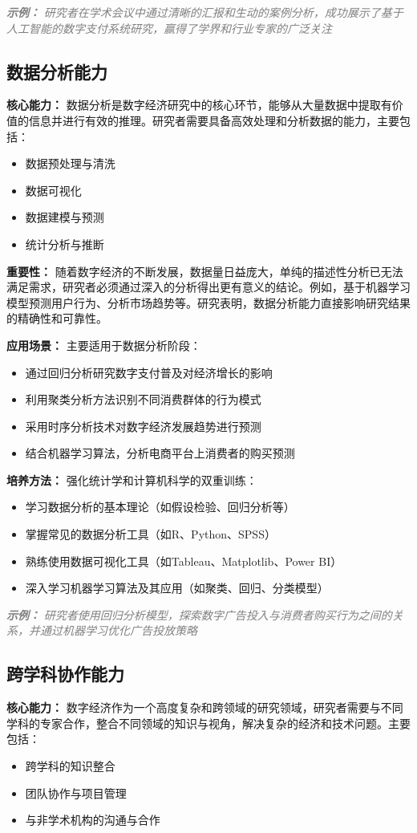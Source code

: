 \documentclass[lang=cn,12pt,a4paper]{elegantpaper}
\newcommand{\skillexample}[1]{\smallskip\noindent\textcolor{gray}{\textit{\footnotesize\textbf{示例：}} \textit{\footnotesize #1}}}
\begin{document}
\skillexample{研究者在学术会议中通过清晰的汇报和生动的案例分析，成功展示了基于人工智能的数字支付系统研究，赢得了学界和行业专家的广泛关注}
\subsection{数据分析能力}
{\textbf{核心能力：}} 数据分析是数字经济研究中的核心环节，能够从大量数据中提取有价值的信息并进行有效的推理。研究者需要具备高效处理和分析数据的能力，主要包括：
\begin{itemize}
    \item 数据预处理与清洗
    \item 数据可视化
    \item 数据建模与预测
    \item 统计分析与推断
\end{itemize}

{\textbf{重要性：}} 随着数字经济的不断发展，数据量日益庞大，单纯的描述性分析已无法满足需求，研究者必须通过深入的分析得出更有意义的结论。例如，基于机器学习模型预测用户行为、分析市场趋势等。研究表明，数据分析能力直接影响研究结果的精确性和可靠性。

{\textbf{应用场景：}} 主要适用于数据分析阶段：
\begin{itemize}
    \item 通过回归分析研究数字支付普及对经济增长的影响
    \item 利用聚类分析方法识别不同消费群体的行为模式
    \item 采用时序分析技术对数字经济发展趋势进行预测
    \item 结合机器学习算法，分析电商平台上消费者的购买预测
\end{itemize}

{\textbf{培养方法：}} 强化统计学和计算机科学的双重训练：
\begin{itemize}
    \item 学习数据分析的基本理论（如假设检验、回归分析等）
    \item 掌握常见的数据分析工具（如R、Python、SPSS）
    \item 熟练使用数据可视化工具（如Tableau、Matplotlib、Power BI）
    \item 深入学习机器学习算法及其应用（如聚类、回归、分类模型）
\end{itemize}

\skillexample{研究者使用回归分析模型，探索数字广告投入与消费者购买行为之间的关系，并通过机器学习优化广告投放策略}

\subsection{跨学科协作能力}
{\textbf{核心能力：}} 数字经济作为一个高度复杂和跨领域的研究领域，研究者需要与不同学科的专家合作，整合不同领域的知识与视角，解决复杂的经济和技术问题。主要包括：
\begin{itemize}
    \item 跨学科的知识整合
    \item 团队协作与项目管理
    \item 与非学术机构的沟通与合作
\end{itemize}
\end{document}
